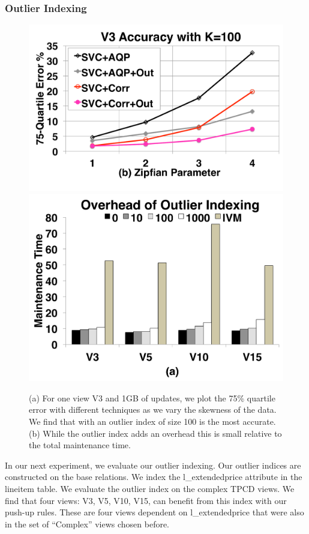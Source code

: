 \subsubsection{Outlier Indexing}

\begin{figure}[t] \vspace{-.5em}
\centering
 \includegraphics[scale=0.13]{exp/msoi_2.pdf}
 \includegraphics[scale=0.13]{exp/msoi_1.pdf}\vspace{-1em}
 \caption{(a) For one view V3 and 1GB of updates, we plot the 75\% quartile error with different techniques as we vary the skewness of the data. We find that \svc with an outlier index of size 100 is the most accurate. (b) While the outlier index adds an overhead this is small relative to the total maintenance time. \vspace{-1.5em}\label{exp5-oi}}
\end{figure}
In our next experiment, we evaluate our outlier indexing.
Our outlier indices are constructed on the base relations.
We index the \textsf{l\_extendedprice} attribute in the \textsf{lineitem} table.
We evaluate the outlier index on the complex TPCD views.
We find that four views: V3, V5, V10, V15, can benefit from this index with our push-up rules. 
These are four views dependent on \textsf{l\_extendedprice} that were also in the set of ``Complex'' views chosen before.

